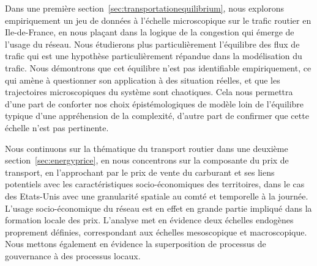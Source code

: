 Dans une première section~\ref{sec:transportationequilibrium}, nous explorons empiriquement un jeu de données à l'échelle microscopique sur le trafic routier en Ile-de-France, en nous plaçant dans la logique de la congestion qui émerge de l'usage du réseau. Nous étudierons plus particulièrement l'équilibre des flux de trafic qui est une hypothèse particulièrement répandue dans la modélisation du trafic. Nous démontrons que cet équilibre n'est pas identifiable empiriquement, ce qui amène à questionner son application à des situation réelles, et que les trajectoires microscopiques du système sont chaotiques. Cela nous permettra d'une part de conforter nos choix épistémologiques de modèle loin de l'équilibre typique d'une appréhension de la complexité, d'autre part de confirmer que cette échelle n'est pas pertinente.

Nous continuons sur la thématique du transport routier dans une deuxième section~\ref{sec:energyprice}, en nous concentrons sur la composante du prix de transport, en l'approchant par le prix de vente du carburant et ses liens potentiels avec les caractéristiques socio-économiques des territoires, dans le cas des Etats-Unis avec une granularité spatiale au comté et temporelle à la journée. L'usage socio-économique du réseau est en effet en grande partie impliqué dans la formation locale des prix. L'analyse met en évidence deux échelles endogènes proprement définies, correspondant aux échelles mesoscopique et macroscopique. Nous mettons également en évidence la superposition de processus de gouvernance à des processus locaux.


\stars











